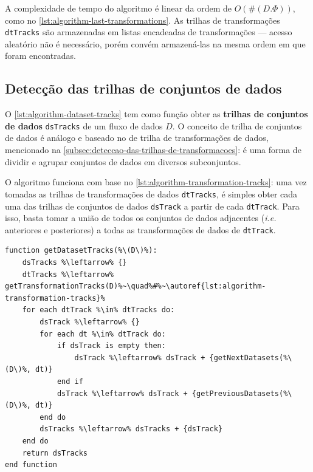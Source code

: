 A complexidade de tempo do algoritmo é linear da ordem de \( O(\#(D.\Phi)) \), como no \autoref{lst:algorithm-last-transformations}. As trilhas de transformações \texttt{dtTracks} são armazenadas em listas encadeadas de transformações --- acesso aleatório não é necessário, porém convém armazená-las na mesma ordem em que foram encontradas.

\subsection{Detecção das trilhas de conjuntos de dados}

O \autoref{lst:algorithm-dataset-tracks} tem como função obter as \textbf{trilhas de conjuntos de dados} \texttt{dsTracks} de um fluxo de dados \( D \). O conceito de trilha de conjuntos de dados é análogo e baseado no de trilha de transformações de dados, mencionado na \autoref{subsec:deteccao-das-trilhas-de-transformacoes}: é uma forma de dividir e agrupar conjuntos de dados em diversos subconjuntos.

O algoritmo funciona com base no \autoref{lst:algorithm-transformation-tracks}: uma vez tomadas as trilhas de transformações de dados \texttt{dtTracks}, é simples obter cada uma das trilhas de conjuntos de dados \texttt{dsTrack} a partir de cada \texttt{dtTrack}. Para isso, basta tomar a união de todos os conjuntos de dados adjacentes (\textit{i.e.} anteriores e posteriores) a todas as transformações de dados de \texttt{dtTrack}.

\begin{minipage}[c]{0.95\textwidth}
\begin{lstlisting}[language=pseudocode,label={lst:algorithm-dataset-tracks},caption={[Detecção das trilhas de conjuntos de dados]Detecção do rastro do fluxo de dados no nível de trilhas de conjuntos de dados.}]
function getDatasetTracks(%\(D\)%):
    dsTracks %\leftarrow% {}
    dtTracks %\leftarrow% getTransformationTracks(D)%~\quad%#%~\autoref{lst:algorithm-transformation-tracks}%
    for each dtTrack %\in% dtTracks do:
        dsTrack %\leftarrow% {}
        for each dt %\in% dtTrack do:
            if dsTrack is empty then:
                dsTrack %\leftarrow% dsTrack + {getNextDatasets(%\(D\)%, dt)}
            end if
            dsTrack %\leftarrow% dsTrack + {getPreviousDatasets(%\(D\)%, dt)}
        end do
        dsTracks %\leftarrow% dsTracks + {dsTrack}
    end do
    return dsTracks
end function
\end{lstlisting}
\end{minipage}

